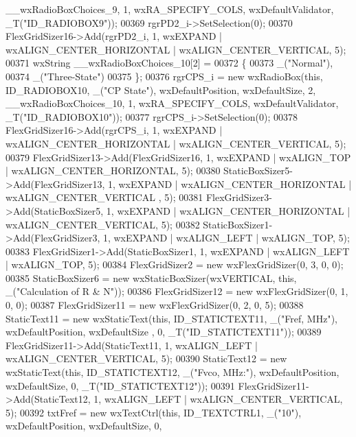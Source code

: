\begin{DoxyCode}
      \_\_wxRadioBoxChoices\_9, 1, wxRA\_SPECIFY\_COLS, wxDefaultValidator, \_T(\textcolor{stringliteral}{"ID\_RADIOBOX9"}));
00369     rgrPD2\_i->SetSelection(0);
00370     FlexGridSizer16->Add(rgrPD2\_i, 1, wxEXPAND | wxALIGN\_CENTER\_HORIZONTAL | wxALIGN\_CENTER\_VERTICAL, 5);
00371     wxString \_\_wxRadioBoxChoices\_10[2] =
00372     \{
00373         \_(\textcolor{stringliteral}{"Normal"}),
00374         \_(\textcolor{stringliteral}{"Three-State"})
00375     \};
00376     rgrCPS\_i = \textcolor{keyword}{new} wxRadioBox(\textcolor{keyword}{this}, ID\_RADIOBOX10, \_(\textcolor{stringliteral}{"CP State"}), wxDefaultPosition, wxDefaultSize, 2, 
      \_\_wxRadioBoxChoices\_10, 1, wxRA\_SPECIFY\_COLS, wxDefaultValidator, \_T(\textcolor{stringliteral}{"ID\_RADIOBOX10"}));
00377     rgrCPS\_i->SetSelection(0);
00378     FlexGridSizer16->Add(rgrCPS\_i, 1, wxEXPAND | wxALIGN\_CENTER\_HORIZONTAL | wxALIGN\_CENTER\_VERTICAL, 5);
00379     FlexGridSizer13->Add(FlexGridSizer16, 1, wxEXPAND | wxALIGN\_TOP | wxALIGN\_CENTER\_HORIZONTAL, 5);
00380     StaticBoxSizer5->Add(FlexGridSizer13, 1, wxEXPAND | wxALIGN\_CENTER\_HORIZONTAL | wxALIGN\_CENTER\_VERTICAL
      , 5);
00381     FlexGridSizer3->Add(StaticBoxSizer5, 1, wxEXPAND | wxALIGN\_CENTER\_HORIZONTAL | wxALIGN\_CENTER\_VERTICAL,
       5);
00382     StaticBoxSizer1->Add(FlexGridSizer3, 1, wxEXPAND | wxALIGN\_LEFT | wxALIGN\_TOP, 5);
00383     FlexGridSizer1->Add(StaticBoxSizer1, 1, wxEXPAND | wxALIGN\_LEFT | wxALIGN\_TOP, 5);
00384     FlexGridSizer2 = \textcolor{keyword}{new} wxFlexGridSizer(0, 3, 0, 0);
00385     StaticBoxSizer6 = \textcolor{keyword}{new} wxStaticBoxSizer(wxVERTICAL, \textcolor{keyword}{this}, \_(\textcolor{stringliteral}{"Calculation of R & N"}));
00386     FlexGridSizer12 = \textcolor{keyword}{new} wxFlexGridSizer(0, 1, 0, 0);
00387     FlexGridSizer11 = \textcolor{keyword}{new} wxFlexGridSizer(0, 2, 0, 5);
00388     StaticText11 = \textcolor{keyword}{new} wxStaticText(\textcolor{keyword}{this}, ID\_STATICTEXT11, \_(\textcolor{stringliteral}{"Fref, MHz"}), wxDefaultPosition, wxDefaultSize
      , 0, \_T(\textcolor{stringliteral}{"ID\_STATICTEXT11"}));
00389     FlexGridSizer11->Add(StaticText11, 1, wxALIGN\_LEFT | wxALIGN\_CENTER\_VERTICAL, 5);
00390     StaticText12 = \textcolor{keyword}{new} wxStaticText(\textcolor{keyword}{this}, ID\_STATICTEXT12, \_(\textcolor{stringliteral}{"Fvco, MHz:"}), wxDefaultPosition, 
      wxDefaultSize, 0, \_T(\textcolor{stringliteral}{"ID\_STATICTEXT12"}));
00391     FlexGridSizer11->Add(StaticText12, 1, wxALIGN\_LEFT | wxALIGN\_CENTER\_VERTICAL, 5);
00392     txtFref = \textcolor{keyword}{new} wxTextCtrl(\textcolor{keyword}{this}, ID\_TEXTCTRL1, \_(\textcolor{stringliteral}{"10"}), wxDefaultPosition, wxDefaultSize, 0, 

\end{DoxyCode}
